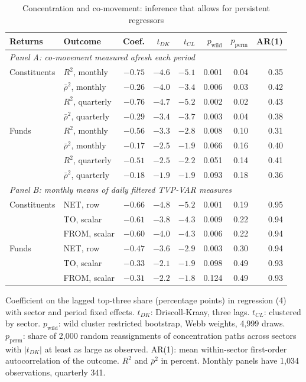 \documentclass[11pt]{article}
\begin{document}
\begin{table}[H]
\centering
\caption{Concentration and co-movement: inference that allows for persistent regressors}
\label{tab:inf}
\small
\begin{tabular}{llrrrrrr}
\toprule
Returns & Outcome & Coef. & $t_{DK}$ & $t_{CL}$ & $p_{\text{wild}}$ & $p_{\text{perm}}$ & AR(1) \\
\midrule
\multicolumn{8}{l}{\textit{Panel A: co-movement measured afresh each period}} \\
Constituents & $R^2$, monthly & $-0.75$ & $-4.6$ & $-5.1$ & 0.001 & 0.04 & 0.35 \\
 & $\bar\rho^2$, monthly & $-0.26$ & $-4.0$ & $-3.4$ & 0.006 & 0.03 & 0.42 \\
 & $R^2$, quarterly & $-0.76$ & $-4.7$ & $-5.2$ & 0.002 & 0.02 & 0.43 \\
 & $\bar\rho^2$, quarterly & $-0.29$ & $-3.4$ & $-3.7$ & 0.003 & 0.04 & 0.38 \\
Funds & $R^2$, monthly & $-0.56$ & $-3.3$ & $-2.8$ & 0.008 & 0.10 & 0.31 \\
 & $\bar\rho^2$, monthly & $-0.17$ & $-2.5$ & $-1.9$ & 0.066 & 0.16 & 0.40 \\
 & $R^2$, quarterly & $-0.51$ & $-2.5$ & $-2.2$ & 0.051 & 0.14 & 0.41 \\
 & $\bar\rho^2$, quarterly & $-0.18$ & $-1.9$ & $-1.9$ & 0.093 & 0.18 & 0.36 \\
\multicolumn{8}{l}{\textit{Panel B: monthly means of daily filtered TVP-VAR measures}} \\
Constituents & NET, row & $-0.66$ & $-4.8$ & $-5.2$ & 0.001 & 0.19 & 0.95 \\
 & TO, scalar & $-0.61$ & $-3.8$ & $-4.3$ & 0.009 & 0.22 & 0.94 \\
 & FROM, scalar & $-0.60$ & $-4.0$ & $-4.3$ & 0.006 & 0.22 & 0.94 \\
Funds & NET, row & $-0.47$ & $-3.6$ & $-2.9$ & 0.003 & 0.30 & 0.94 \\
 & TO, scalar & $-0.33$ & $-2.1$ & $-1.9$ & 0.098 & 0.49 & 0.93 \\
 & FROM, scalar & $-0.31$ & $-2.2$ & $-1.8$ & 0.124 & 0.49 & 0.93 \\
\bottomrule
\end{tabular}

\smallskip
\parbox{0.95\textwidth}{\footnotesize Coefficient on the lagged top-three share (percentage points) in regression (4) with sector and period fixed effects. $t_{DK}$: Driscoll-Kraay, three lags. $t_{CL}$: clustered by sector. $p_{\text{wild}}$: wild cluster restricted bootstrap, Webb weights, 4,999 draws. $p_{\text{perm}}$: share of 2,000 random reassignments of concentration paths across sectors with $|t_{DK}|$ at least as large as observed. AR(1): mean within-sector first-order autocorrelation of the outcome. $R^2$ and $\bar\rho^2$ in percent. Monthly panels have 1,034 observations, quarterly 341.}
\end{table}
\end{document}

